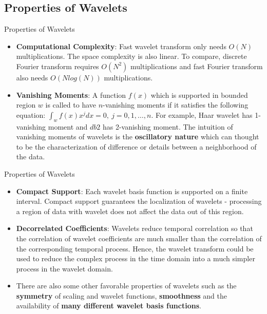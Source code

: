 \documentclass{beamer}
\newcommand{\1}[1]{\mathds{1}\left(#1\right)}
\begin{document}
\subsection{Properties of Wavelets}
\begin{frame}{Properties of Wavelets}
\begin{itemize} [<+->]
	\item \textbf{Computational Complexity}: Fast wavelet transform only needs $O(N)$ multiplications. The space complexity is also linear. To compare, discrete Fourier transform requires $O(N^2)$ multiplications and fast Fourier transform also needs $O(N log (N))$ multiplications.
	
	\item \textbf{Vanishing Moments}: A function $f (x)$ which is supported in bounded region $w$
	is called to have $n$-vanishing moments if it satisfies the following equation:
	$\int_w f(x)x^j dx = 0,\ j = 0,1,\ldots,n$. For example, Haar wavelet has 1-vanishing
	moment and $db2$ has 2-vanishing moment. The intuition of vanishing moments
	of wavelets is the \textbf{oscillatory nature} which can thought to be the characterization
	of difference or details between a neighborhood of the data.
	
\end{itemize}
\end{frame}

\begin{frame}{Properties of Wavelets}
\begin{itemize} [<+->]
	\item \textbf{Compact Support}: Each wavelet basis function is supported on a finite
	interval. Compact support guarantees the localization of wavelets - processing a region of data with wavelet does not affect the data out of this region.
	
	\item \textbf{Decorrelated Coefficients}: Wavelets reduce temporal correlation so that the correlation of wavelet coefficients are much smaller than the correlation of the corresponding temporal process. Hence, the wavelet transform could be used to reduce the complex process in the time domain into a much simpler process in the wavelet domain.
	
	\item There are also some other favorable properties of
	wavelets such as the \textbf{symmetry} of scaling and wavelet functions, \textbf{smoothness}
	and the availability of \textbf{many different wavelet basis functions}.
\end{itemize}
\end{frame}
\end{document}
